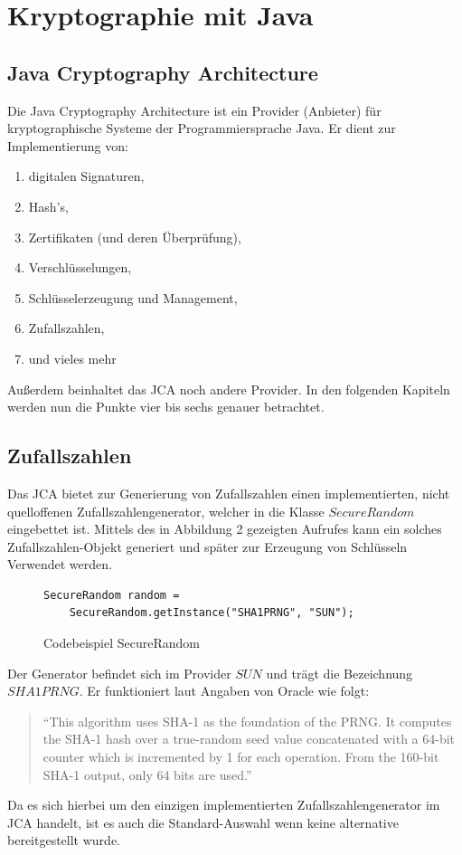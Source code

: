 \documentclass[paper=a4,11pt,german]{scrartcl} %
\begin{document}
\section{Kryptographie mit Java}

\subsection{Java Cryptography Architecture}
Die Java Cryptography Architecture ist ein Provider (Anbieter) für kryptographische Systeme der Programmiersprache Java.
Er dient zur Implementierung von:
\begin{enumerate}
\item digitalen Signaturen,
\item Hash's,
\item Zertifikaten (und deren Überprüfung),
\item Verschlüsselungen,
\item Schlüsselerzeugung und Management,
\item Zufallszahlen,
\item und vieles mehr \cite{JCAdoc}
\end{enumerate}
Außerdem beinhaltet das JCA noch andere Provider.
In den folgenden Kapiteln werden nun die Punkte vier bis sechs genauer betrachtet. 
 
\subsection{Zufallszahlen}
Das JCA bietet zur Generierung von Zufallszahlen einen implementierten, nicht quelloffenen Zufallszahlengenerator, welcher in die Klasse
$SecureRandom$ eingebettet ist. Mittels des in Abbildung 2 gezeigten Aufrufes kann ein solches Zufallszahlen-Objekt generiert und später zur Erzeugung von Schlüsseln Verwendet werden.

\begin{figure}[hbtp]
\caption{Codebeispiel SecureRandom}
\begin{lstlisting}[frame=shadowbox]
SecureRandom random =
	SecureRandom.getInstance("SHA1PRNG", "SUN");
\end{lstlisting}
\label{SecureRandom}
\end{figure}
Der Generator befindet sich im Provider $SUN$ und trägt die Bezeichnung $SHA1PRNG$. Er funktioniert laut Angaben von Oracle wie folgt:  
\begin{quote}
``This algorithm uses SHA-1 as the foundation of the PRNG.
It computes the SHA-1 hash over a true-random seed value
 concatenated with a 64-bit counter which is incremented 
 by 1 for each operation. From the 160-bit SHA-1 output, only 64 bits are used.'' \cite{Oracle}
\end{quote}
Da es sich hierbei um den einzigen implementierten Zufallszahlengenerator im JCA handelt, ist es auch die Standard-Auswahl wenn keine alternative bereitgestellt wurde.
\end{document}
